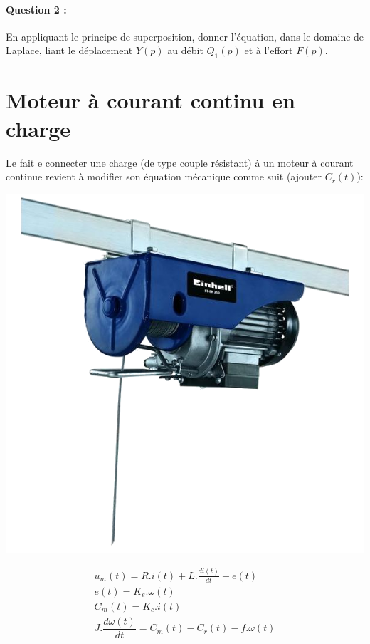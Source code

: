 \paragraph{Question 2 :} En appliquant le principe de superposition, donner l'équation, dans le domaine de Laplace, liant le déplacement $Y(p)$ au débit $Q_1(p)$ et à l'effort $F(p)$.

\newpage

\section{Moteur à courant continu en charge}

Le fait e connecter une charge (de type couple résistant) à un moteur à courant continue revient à modifier son équation mécanique comme suit (ajouter $C_r(t)$):

\setcounter{equation}{0}


\begin{minipage}{0.40\linewidth}
 \includegraphics[width=0.8\linewidth]{img/treuil}
\end{minipage}\hfill
\begin{minipage}{0.50\linewidth}
\begin{eqnarray}
u_m(t)=R.i(t)+L.\frac{di(t)}{dt}+e(t) \\
e(t)=K_e.\omega(t) \\ 
C_m(t)=K_c.i(t) \\
J.\dfrac{d\omega (t)}{dt}=C_m(t)-C_r(t)-f.\omega(t)
\end{eqnarray}
\end{minipage}

